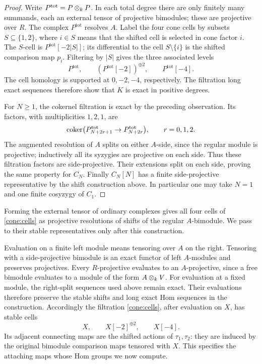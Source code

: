 \begin{proof}
Write $P^{\mathrm{tot}}=P\otimes_{k}P$.
In each total degree there are only finitely many summands, each an
external tensor of projective bimodules; these are projective over $R$.
The complex $P^{\mathrm{tot}}$ resolves $A$.
Label the four cone cells by subsets $S\subseteq\{1,2\}$, where $i\in S$
means that the shifted cell is selected in cone factor $i$.
The $S$-cell is $P^{\mathrm{tot}}[-2|S|]$; its differential to the cell
$S\setminus\{i\}$ is the shifted comparison map $p_i$.
Filtering by $|S|$ gives the three associated levels
\begin{equation}
 P^{\mathrm{tot}},\qquad
 (P^{\mathrm{tot}}[-2])^{\oplus2},\qquad
 P^{\mathrm{tot}}[-4].
 \label{cone:cells}
\end{equation}
The cell homology is supported at $0,-2,-4$, respectively. The filtration
long exact sequences therefore show that $K$ is exact in positive degrees.

For $N\geq1$, the cokernel filtration is exact by the preceding observation.
Its factors, with multiplicities $1,2,1$, are
\[
 \operatorname{coker}\bigl(P^{\mathrm{tot}}_{N+2r+1}
       \to P^{\mathrm{tot}}_{N+2r}\bigr),\qquad r=0,1,2.
\]
The augmented resolution of $A$ splits on either $A$-side, since the
regular module is projective; inductively all its syzygies are projective
on each side. Thus these filtration factors are side-projective.
Their extensions split on each side, proving the same property for $C_N$.
Finally $C_N[N]$ has a finite side-projective representative by the shift
construction above. In particular one may take $N=1$ and one finite
cosyzygy of $C_1$.
\end{proof}

Forming the external tensor of ordinary complexes gives all four cells
of \eqref{cone:cells} as projective resolutions of shifts of the regular
$A$-bimodule. We pass to their stable representatives only after this
construction.

Evaluation on a finite left module means tensoring over $A$ on the right.
Tensoring with a side-projective bimodule is an exact functor of left
$A$-modules and preserves projectives.
Every $R$-projective evaluates to an $A$-projective, since a free bimodule
evaluates to a module of the form $A\otimes_{k}V$.
For evaluation at a fixed module, the right-split sequences used above
remain exact. Their evaluations therefore preserve the stable shifts and
long exact Hom sequences in the construction.
Accordingly the filtration \eqref{cone:cells}, after evaluation on $X$,
has stable cells
\[
 X,\qquad X[-2]^{\oplus2},\qquad X[-4].
\]
Its adjacent connecting maps are the shifted actions of $\tau_1,\tau_2$:
they are induced by the original bimodule comparison maps tensored with
$X$. This specifies the attaching maps whose Hom groups we now compute.

